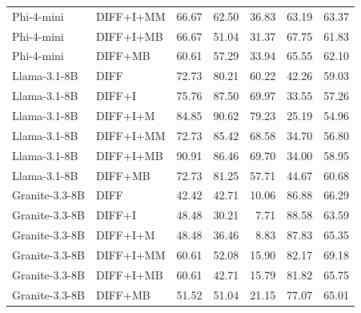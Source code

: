 \begin{table}[t]
\begin{tabular}{llrrrrr}
Phi-4-mini & DIFF+I+MM & 66.67 & 62.50 & 36.83 & 63.19 & 63.37 \\
Phi-4-mini & DIFF+I+MB & 66.67 & 51.04 & 31.37 & 67.75 & 61.83 \\
Phi-4-mini & DIFF+MB & 60.61 & 57.29 & 33.94 & 65.55 & 62.10 \\
Llama-3.1-8B & DIFF & 72.73 & 80.21 & 60.22 & 42.26 & 59.03 \\
Llama-3.1-8B & DIFF+I & 75.76 & 87.50 & 69.97 & 33.55 & 57.26 \\
Llama-3.1-8B & DIFF+I+M & 84.85 & 90.62 & 79.23 & 25.19 & 54.96 \\
Llama-3.1-8B & DIFF+I+MM & 72.73 & 85.42 & 68.58 & 34.70 & 56.80 \\
Llama-3.1-8B & DIFF+I+MB & 90.91 & 86.46 & 69.70 & 34.00 & 58.95 \\
Llama-3.1-8B & DIFF+MB & 72.73 & 81.25 & 57.71 & 44.67 & 60.68 \\
Granite-3.3-8B & DIFF & 42.42 & 42.71 & 10.06 & 86.88 & 66.29 \\
Granite-3.3-8B & DIFF+I & 48.48 & 30.21 & 7.71 & 88.58 & 63.59 \\
Granite-3.3-8B & DIFF+I+M & 48.48 & 36.46 & 8.83 & 87.83 & 65.35 \\
Granite-3.3-8B & DIFF+I+MM & 60.61 & 52.08 & 15.90 & 82.17 & 69.18 \\
Granite-3.3-8B & DIFF+I+MB & 60.61 & 42.71 & 15.79 & 81.82 & 65.75 \\
Granite-3.3-8B & DIFF+MB & 51.52 & 51.04 & 21.15 & 77.07 & 65.01 \\
\bottomrule
\end{tabular}
\end{table}
